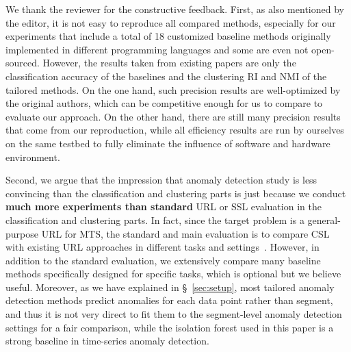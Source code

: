 \begin{sloppypar}

We thank the reviewer for the constructive feedback. First, as also mentioned by the editor, it is not easy to reproduce all compared methods, especially for our experiments that include a total of 18 customized baseline methods originally implemented in different programming languages and some are even not open-sourced. However, the results taken from existing papers are only the classification accuracy of the baselines and the clustering RI and NMI of the tailored methods. On the one hand, such precision results are well-optimized by the original authors, which can be competitive enough for us to compare to evaluate our approach. On the other hand, there are still many precision results that come from our reproduction, while all efficiency results are run by ourselves on the same testbed to fully eliminate the influence of software and hardware environment. 

Second, we argue that the impression that anomaly detection study is less convincing than the classification and clustering parts is just because we conduct \textbf{much more experiments than standard} URL or SSL evaluation in the classification and clustering parts. In fact, since the target problem is a general-purpose URL for MTS, the standard and main evaluation is to compare CSL with existing URL approaches in different tasks and settings~\cite{TS-TCC,softclt}. However, in addition to the standard evaluation, we extensively compare many baseline methods specifically designed for specific tasks, which is optional but we believe useful. Moreover, as we have explained in \S~\ref{sec:setup}, most tailored anomaly detection methods predict anomalies for each data point rather than segment, and thus it is not very direct to fit them to the segment-level anomaly detection settings for a fair comparison, while the isolation forest used in this paper is a strong baseline in time-series anomaly detection.  


\end{sloppypar}
